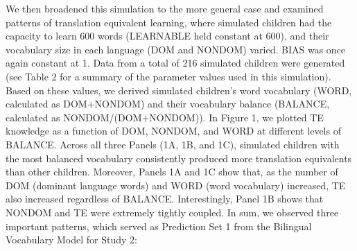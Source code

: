 \documentclass[
  english,
  ,man,floatsintext]{apa6}
\begin{document}
We then broadened this simulation to the more general case and examined patterns of translation equivalent learning, where simulated children had the capacity to learn 600 words (LEARNABLE held constant at 600), and their vocabulary size in each language (DOM and NONDOM) varied. BIAS was once again constant at 1. Data from a total of 216 simulated children were generated (see Table 2 for a summary of the parameter values used in this simulation). Based on these values, we derived simulated children's word vocabulary (WORD, calculated as DOM+NONDOM) and their vocabulary balance (BALANCE, calculated as NONDOM/(DOM+NONDOM)). In Figure 1, we plotted TE knowledge as a function of DOM, NONDOM, and WORD at different levels of BALANCE. Across all three Panels (1A, 1B, and 1C), simulated children with the most balanced vocabulary consistently produced more translation equivalents than other children. Moreover, Panels 1A and 1C show that, as the number of DOM (dominant language words) and WORD (word vocabulary) increased, TE also increased regardless of BALANCE. Interestingly, Panel 1B shows that NONDOM and TE were extremely tightly coupled. In sum, we observed three important patterns, which served as Prediction Set 1 from the Bilingual Vocabulary Model for Study 2:
\end{document}
